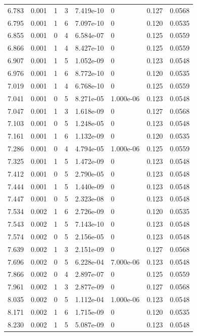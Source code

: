 \documentclass[preview]{standalone}
\begin{document}
{{{\begin{tabular}{L{1.2cm}C{1.2cm} C{0.3cm}C{0.5cm} C{1.4cm}C{1.4cm} C{1.4cm}C{1.4cm}}
  6.783  &  0.001  & 1     &  3 &  7.419e-10  & 0  & 0.127 &  0.0568   \\ 
  6.795  &  0.001  & 1     &  6 &  7.097e-10  & 0  & 0.120 &  0.0535   \\ 
  6.855  &  0.001  & 0     &  4 &  6.584e-07  & 0  & 0.125 &  0.0559   \\ 
  6.866  &  0.001  & 1     &  4 &  8.427e-10  & 0  & 0.125 &  0.0559   \\ 
  6.907  &  0.001  & 1     &  5 &  1.052e-09  & 0  & 0.123 &  0.0548   \\ 
  6.976  &  0.001  & 1     &  6 &  8.772e-10  & 0  & 0.120 &  0.0535   \\ 
  7.019  &  0.001  & 1     &  4 &  6.768e-10  & 0  & 0.125 &  0.0559   \\ 
  7.041  &  0.001  & 0     &  5 &  8.271e-05  & 1.000e-06  & 0.123 &  0.0548   \\ 
  7.047  &  0.001  & 1     &  3 &  1.618e-09  & 0  & 0.127 &  0.0568   \\ 
  7.103  &  0.001  & 0     &  5 &  1.248e-05  & 0  & 0.123 &  0.0548   \\ 
  7.161  &  0.001  & 1     &  6 &  1.132e-09  & 0  & 0.120 &  0.0535   \\ 
  7.286  &  0.001  & 0     &  4 &  4.794e-05  & 1.000e-06  & 0.125 &  0.0559   \\ 
  7.325  &  0.001  & 1     &  5 &  1.472e-09  & 0  & 0.123 &  0.0548   \\ 
  7.412  &  0.001  & 0     &  5 &  2.790e-05  & 0  & 0.123 &  0.0548   \\ 
  7.444  &  0.001  & 1     &  5 &  1.440e-09  & 0  & 0.123 &  0.0548   \\ 
  7.447  &  0.001  & 0     &  5 &  2.323e-08  & 0  & 0.123 &  0.0548   \\ 
  7.534  &  0.002  & 1     &  6 &  2.726e-09  & 0  & 0.120 &  0.0535   \\ 
  7.543  &  0.002  & 1     &  5 &  7.143e-10  & 0  & 0.123 &  0.0548   \\ 
  7.574  &  0.002  & 0     &  5 &  2.156e-05  & 0  & 0.123 &  0.0548   \\ 
  7.639  &  0.002  & 1     &  3 &  2.151e-09  & 0  & 0.127 &  0.0568   \\ 
  7.696  &  0.002  & 0     &  5 &  6.228e-04  & 7.000e-06  & 0.123 &  0.0548   \\ 
  7.866  &  0.002  & 0     &  4 &  2.897e-07  & 0  & 0.125 &  0.0559   \\ 
  7.961  &  0.002  & 1     &  3 &  2.877e-09  & 0  & 0.127 &  0.0568   \\ 
  8.035  &  0.002  & 0     &  5 &  1.112e-04  & 1.000e-06  & 0.123 &  0.0548   \\ 
  8.171  &  0.002  & 1     &  6 &  1.715e-09  & 0  & 0.120 &  0.0535   \\ 
  8.230  &  0.002  & 1     &  5 &  5.087e-09  & 0  & 0.123 &  0.0548   \\ 
\hline 
\end{tabular} 

}}}
\end{document}
